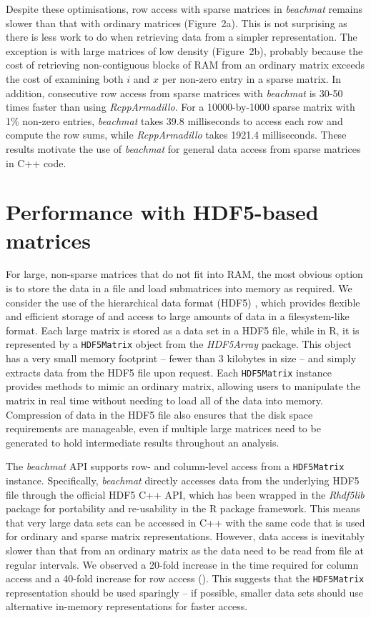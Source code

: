 \documentclass{article}
\newcommand{\beachmat}{\textit{beachmat}}
\newcommand{\code}[1]{\texttt{#1}}
\begin{document}
Despite these optimisations, row access with sparse matrices in \beachmat{} remains slower than that with ordinary matrices (Figure~2a).
This is not surprising as there is less work to do when retrieving data from a simpler representation.
The exception is with large matrices of low density (Figure~2b), probably because the cost of retrieving non-contiguous blocks of RAM from an ordinary matrix exceeds the cost of examining both $i$ and $x$ per non-zero entry in a sparse matrix.
In addition, consecutive row access from sparse matrices with \beachmat{} is 30-50 times faster than using \textit{RcppArmadillo}.
For a 10000-by-1000 sparse matrix with 1\% non-zero entries, \beachmat{} takes 39.8 milliseconds to access each row and compute the row sums, while \textit{RcppArmadillo} takes 1921.4 milliseconds.
These results motivate the use of \beachmat{} for general data access from sparse matrices in C++ code.

\section{Performance with HDF5-based matrices}
For large, non-sparse matrices that do not fit into RAM, the most obvious option is to store the data in a file and load submatrices into memory as required.
We consider the use of the hierarchical data format (HDF5) \cite{hdf5}, which provides flexible and efficient storage of and access to large amounts of data in a filesystem-like format.
Each large matrix is stored as a data set in a HDF5 file, while in R, it is represented by a \code{HDF5Matrix} object from the \textit{HDF5Array} package.
This object has a very small memory footprint -- fewer than 3 kilobytes in size -- and simply extracts data from the HDF5 file upon request.
Each \code{HDF5Matrix} instance provides methods to mimic an ordinary matrix, allowing users to manipulate the matrix in real time without needing to load all of the data into memory.
Compression of data in the HDF5 file also ensures that the disk space requirements are manageable, even if multiple large matrices need to be generated to hold intermediate results throughout an analysis.

The \beachmat{} API supports row- and column-level access from a \code{HDF5Matrix} instance.
Specifically, \beachmat{} directly accesses data from the underlying HDF5 file through the official HDF5 C++ API, which has been wrapped in the \textit{Rhdf5lib} package for portability and re-usability in the R package framework.
This means that very large data sets can be accessed in C++ with the same code that is used for ordinary and sparse matrix representations.
However, data access is inevitably slower than that from an ordinary matrix as the data need to be read from file at regular intervals.
We observed a 20-fold increase in the time required for column access and a 40-fold increase for row access (\suppfighdfspeed{}).
This suggests that the \code{HDF5Matrix} representation should be used sparingly -- if possible, smaller data sets should use alternative in-memory representations for faster access.
\end{document}
